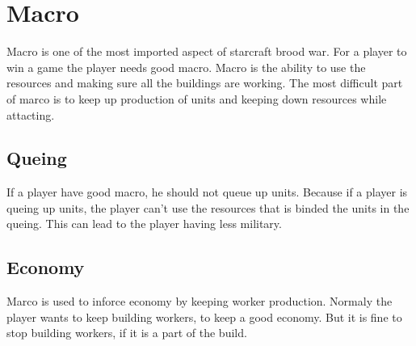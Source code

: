 \section{Macro}
Macro is one of the most imported aspect of starcraft brood war. For a player to win a game the player needs good macro. Macro is the ability
to use the resources and making sure all the buildings are working. The most difficult part of marco is to keep up production of units and keeping
down resources while attacting.  

	\subsection{Queing}
	If a player have good macro, he should not queue up units. Because if a player is queing up units, the player can't use the resources that is binded
	the units in the queing. This can lead to the player having less military.

	\subsection{Economy}
	Marco is used to inforce economy by keeping worker production. Normaly the player wants to keep building workers, to keep a good economy.
	But it is fine to stop building workers, if it is a part of the build.
